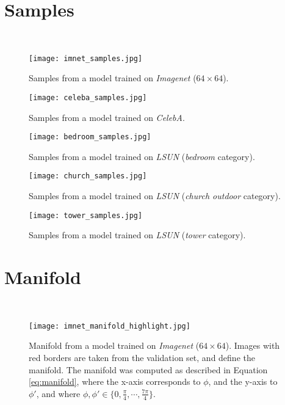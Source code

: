 \documentclass{article}
\begin{document}
\small
\setlength{\bibsep}{0pt plus 0.12ex}



\iftrue
\newpage
\appendix
\section{Samples}
~ \\

\begin{figure}[H]
    \centering \texttt{[image: imnet\_samples.jpg]}
    \caption{Samples from a model trained on \emph{Imagenet} ($64 \times 64$).}
\vspace{120pt}
\end{figure}

\begin{figure}[H]
\vspace{80pt}
    \centering \texttt{[image: celeba\_samples.jpg]}
    \caption{Samples from a model trained on \emph{CelebA}.}
\end{figure}

\begin{figure}[H]
\vspace{80pt}
    \centering \texttt{[image: bedroom\_samples.jpg]}
    \caption{Samples from a model trained on \emph{LSUN} (\emph{bedroom} category).}
\end{figure}

\begin{figure}[H]
\vspace{80pt}
    \centering \texttt{[image: church\_samples.jpg]}
    \caption{Samples from a model trained on \emph{LSUN} (\emph{church outdoor} category).}
\end{figure}

\begin{figure}[H]
\vspace{80pt}
    \centering \texttt{[image: tower\_samples.jpg]}
    \caption{Samples from a model trained on \emph{LSUN} (\emph{tower} category).}
\end{figure}

\newpage

\section{Manifold}
~ \\

\begin{figure}[H]
    \centering \texttt{[image: imnet\_manifold\_highlight.jpg]}
    \caption{Manifold from a model trained on \emph{Imagenet} ($64 \times 64$). Images with red borders are taken from the validation set, and define the manifold. The manifold was computed as described in Equation \ref{eq:manifold}, where the x-axis corresponds to $\phi$, and the y-axis to $\phi'$, and where $\phi, \phi' \in \{0, \frac{\pi}{4}, \cdots, \frac{7\pi}{4}\}$.
}
\vspace{80pt}
\end{figure}
\end{document}
